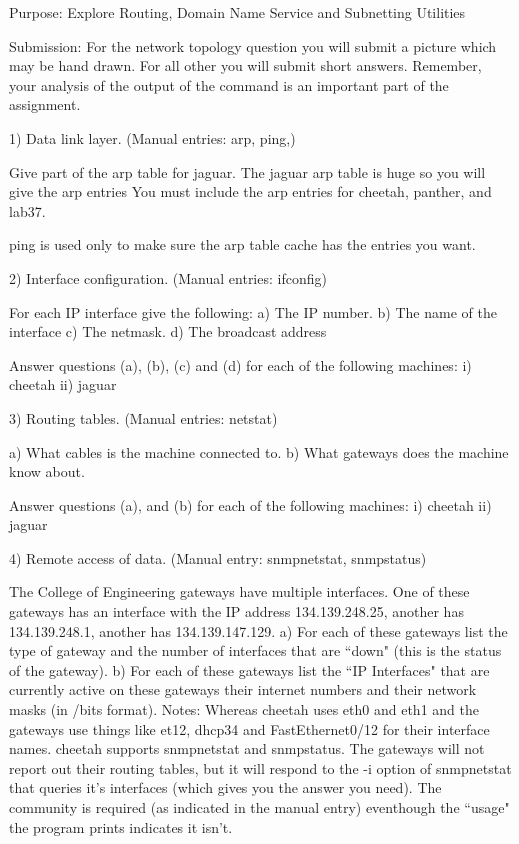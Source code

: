 

\nopagenumbers
{}
\parindent 0pt

Purpose: Explore Routing, Domain Name Service and Subnetting Utilities

Submission: 
For the network topology question you will submit a picture which may be hand 
drawn. 
For all other you will submit short answers.
Remember, your analysis of the output of the command is an important part
of the assignment.

1)
Data link layer.
(Manual entries: arp, ping,)

Give part of the arp table for jaguar.
The jaguar arp table is huge so you will give the arp entries
You must include the arp entries for cheetah, panther, and lab37.

ping is used only to make sure the arp table cache has the entries you want.

\vfill
2) Interface configuration. (Manual entries: ifconfig)

For each IP interface give the following:
a) The IP number.
b) The name of the interface
c) The netmask.
d) The broadcast address

Answer questions (a), (b), (c) and (d) for each of the following machines:
\hfil\break
i) cheetah
\hskip1in
ii) jaguar
\hfil\break

\vfill
3) Routing tables. (Manual entries: netstat)

a) What cables is the machine connected to.
b) What gateways does the machine know about.

Answer questions (a), and (b) for each of the following machines:
\hfil\break
i) cheetah
\hskip1in
ii) jaguar
\hskip1in

\vfill
4) Remote access of data.
(Manual entry: snmpnetstat, snmpstatus)

The College of Engineering gateways have multiple interfaces.
One of these gateways has an interface with the IP address 134.139.248.25,
another has 134.139.248.1, another has 134.139.147.129.
a) For each of these gateways list the type of gateway and the
number of interfaces that are ``down" (this is the status of
the gateway).
b) For each of these gateways list
the ``IP Interfaces" that are currently active on these gateways
their internet numbers and their network masks (in /bits format).
Notes: Whereas cheetah uses eth0 and eth1 and the
gateways use things like et12, dhcp34 and FastEthernet0/12 for
their interface names.
{\ltt{}cheetah} supports snmpnetstat and snmpstatus.
The gateways will not report out their routing tables,
but it will respond to the {\ltt{}-i} option of {\ltt{}snmpnetstat}
that queries it's interfaces (which gives you the answer you need).
The community is required (as indicated in the manual entry)
eventhough the ``usage" the program prints indicates it isn't.


